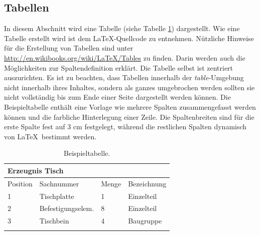\documentclass[13pt,a4paper, listof=entryprefix, bibliography=totocnumbered,toc=listofnumbered,lof=listofnumbered]{scrartcl}
\begin{document}
\subsection{Tabellen}
\label{ch_tabellen}
In diesem Abschnitt wird eine Tabelle (siehe Tabelle \ref{tab:beispiel}) dargestellt. Wie eine Tabelle erstellt wird ist dem \LaTeX-Quellcode zu entnehmen. Nützliche Hinweise für die Erstellung von Tabellen sind unter \url{http://en.wikibooks.org/wiki/LaTeX/Tables} zu finden. Darin werden auch die Möglichkeiten zur Spaltendefinition erklärt. Die Tabelle selbst ist zentriert auszurichten. Es ist zu beachten, dass Tabellen innerhalb der \textit{table}-Umgebung nicht innerhalb ihres Inhaltes, sondern als ganzes umgebrochen werden sollten sie nicht vollständig bis zum Ende einer Seite dargestellt werden können. Die Beispieltabelle enthält eine Vorlage wie mehrere Spalten zusammengefasst werden können und die farbliche Hinterlegung einer Zeile. Die Spaltenbreiten sind für die erste Spalte fest auf 3 cm festgelegt, während die restlichen Spalten dynamisch von \LaTeX \ bestimmt werden.

\begin{table}[H]	%
	\centering		%
	\begin{tabularx}{\linewidth}{|p{3cm}|X|X|X|}
		\hline %
		\multicolumn{4}{|l|}{Erzeugnis Tisch}              \\ \hline
		\hline %
		Position & Sachnummer        & Menge & Bezeichnung \\ \hline
		1        & Tischplatte       & 1     & Einzelteil  \\ %
		2        & Befestigungselem. & 8     & Einzelteil  \\ %
		3        & Tischbein         & 4     & Baugruppe   \\ %
		\hline %
		\caption{Beispieltabelle.} %
		\label{tab:beispiel}
	\end{tabularx}
\end{table}
\end{document}
